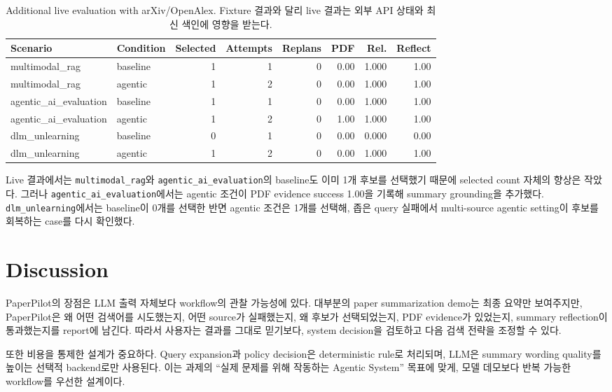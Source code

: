 \documentclass[sigconf,nonacm]{acmart}
\begin{document}
\begin{table}[t]
  \centering
  \caption{Additional live evaluation with arXiv/OpenAlex. Fixture 결과와 달리 live 결과는 외부 API 상태와 최신 색인에 영향을 받는다.}
  \label{tab:live-results}
  \small
  \begin{tabular}{llrrrrrr}
    \toprule
    Scenario & Condition & Selected & Attempts & Replans & PDF & Rel. & Reflect \\
    \midrule
    multimodal\_rag & baseline & 1 & 1 & 0 & 0.00 & 1.000 & 1.00 \\
    multimodal\_rag & agentic & 1 & 2 & 0 & 0.00 & 1.000 & 1.00 \\
    agentic\_ai\_evaluation & baseline & 1 & 1 & 0 & 0.00 & 1.000 & 1.00 \\
    agentic\_ai\_evaluation & agentic & 1 & 2 & 0 & 1.00 & 1.000 & 1.00 \\
    dlm\_unlearning & baseline & 0 & 1 & 0 & 0.00 & 0.000 & 0.00 \\
    dlm\_unlearning & agentic & 1 & 2 & 0 & 0.00 & 1.000 & 1.00 \\
    \bottomrule
  \end{tabular}
\end{table}

Live 결과에서는 \texttt{multimodal\_rag}와 \texttt{agentic\_ai\_evaluation}의 baseline도 이미 1개 후보를 선택했기 때문에 selected count 자체의 향상은 작았다. 그러나 \texttt{agentic\_ai\_evaluation}에서는 agentic 조건이 PDF evidence success 1.00을 기록해 summary grounding을 추가했다. \texttt{dlm\_unlearning}에서는 baseline이 0개를 선택한 반면 agentic 조건은 1개를 선택해, 좁은 query 실패에서 multi-source agentic setting이 후보를 회복하는 case를 다시 확인했다.

\section{Discussion}

PaperPilot의 장점은 LLM 출력 자체보다 workflow의 관찰 가능성에 있다. 대부분의 paper summarization demo는 최종 요약만 보여주지만, PaperPilot은 왜 어떤 검색어를 시도했는지, 어떤 source가 실패했는지, 왜 후보가 선택되었는지, PDF evidence가 있었는지, summary reflection이 통과했는지를 report에 남긴다. 따라서 사용자는 결과를 그대로 믿기보다, system decision을 검토하고 다음 검색 전략을 조정할 수 있다.

또한 비용을 통제한 설계가 중요하다. Query expansion과 policy decision은 deterministic rule로 처리되며, LLM은 summary wording quality를 높이는 선택적 backend로만 사용된다. 이는 과제의 ``실제 문제를 위해 작동하는 Agentic System'' 목표에 맞게, 모델 데모보다 반복 가능한 workflow를 우선한 설계이다.
\end{document}
